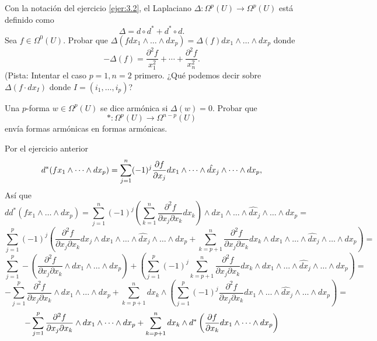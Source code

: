 \documentclass[twoside]{article}
\begin{document}
\begin{ejercicio}{3.3}
Con la notación del ejercicio \ref{ejer:3.2}, el Laplaciano $\Delta:\Omega^p(U)\to\Omega^p(U)$ está definido como
\[
\Delta=d\circ d^*+d^*\circ d.
\]
Sea $f\in\Omega^0(U)$. Probar que $\Delta(f dx_1\land\dots\land dx_p)=\Delta(f)dx_1\land\dots\land dx_p$ donde
\[
-\Delta(f)=\frac{\partial^2 f}{x_1^2}+\cdots+\frac{\partial^2 f}{x_n^2}.
\]
(Pista: Intentar el caso $p=1,n=2$ primero. ¿Qué podemos decir sobre $\Delta(f\cdot dx_I)$ donde $I=(i_1,\dots, i_p)$?

Una $p$-forma $w\in\Omega^p(U)$ se dice armónica si $\Delta(w)=0$. Probar que
\[
*:\Omega^p(U)\to \Omega^{n-p}(U)
\]
envía formas armónicas en formas armónicas.
\end{ejercicio}
\begin{solucion}
Por el ejercicio anterior
\[
d^*(fx_1\land\dots\land dx_p)=\sum_{j=1}^n(-1)^j\frac{\partial f}{\partial x_j}dx_1\land\dots\land\hat{dx}_j\land\dots\land dx_p,
\]
Así que
\[
dd^*(fx_1\land\dots\land dx_p)=\sum_{j=1}^n(-1)^j\left(\sum_{k=1}^n\frac{\partial^2 f}{\partial x_j\partial x_k}dx_k\right)\land dx_1\land\dots\land\hat{dx}_j\land\dots\land dx_p=
\]
\[
\sum
_{j=1}^p(-1)^j\left(\frac{\partial^2 f}{\partial x_j\partial x_k}dx_j\land dx_1\land\dots\land\hat{dx}_j\land\dots\land dx_p+\sum_{k=p+1}^n\frac{\partial^2 f}{\partial x_j\partial x_k}dx_k\land dx_1\land\dots\land\hat{dx}_j\land\dots\land dx_p\right)=
\]
\[
\sum
_{j=1}^p-\left(\frac{\partial^2 f}{\partial x_j\partial x_k}\land dx_1\land\dots\land dx_p\right)+\left(\sum_{j=1}^p(-1)^j\sum_{k=p+1}^n\frac{\partial^2 f}{\partial x_j\partial x_k}dx_k\land dx_1\land\dots\land\hat{dx}_j\land\dots\land dx_p\right)=
\]
\[
-\sum_{j=1}^p\frac{\partial^2 f}{\partial x_j\partial x_k}\land dx_1\land\dots\land dx_p+\sum_{k=p+1}^ndx_k\land\left(\sum_{j=1}^p(-1)^j\frac{\partial^2 f}{\partial x_j\partial x_k}dx_1\land\dots\land\hat{dx}_j\land\dots\land dx_p\right)=
\]
\[
-\sum_{j=1}^p\frac{\partial^2 f}{\partial x_j\partial x_k}\land dx_1\land\dots\land dx_p+\sum_{k=p+1}^ndx_k\land d^*\left(\frac{\partial f}{\partial x_k}dx_1\land\dots\land dx_p\right)
\]


\end{solucion}
\end{document}
